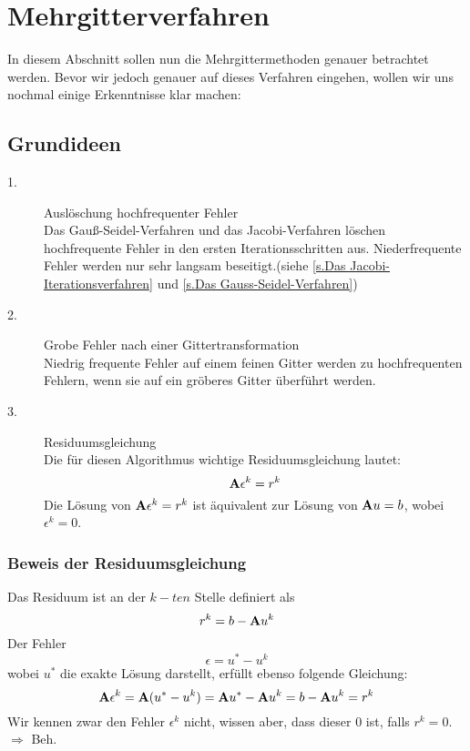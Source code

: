 \chapter{Mehrgitterverfahren}\label{c.Mehrgitterverfahren}

In diesem Abschnitt sollen nun die Mehrgittermethoden genauer betrachtet werden. Bevor wir jedoch genauer auf dieses Verfahren eingehen, wollen wir uns nochmal einige Erkenntnisse klar machen:

\section{Grundideen}

\begin{description}

\item[1.] Auslöschung hochfrequenter Fehler \\
Das Gauß-Seidel-Verfahren und das Jacobi-Verfahren löschen hochfrequente Fehler in den ersten Iterationsschritten aus. Niederfrequente Fehler werden nur sehr langsam beseitigt.(siehe \autoref{s.Das Jacobi-Iterationsverfahren} und \autoref{s.Das Gauss-Seidel-Verfahren})
\item[2.] Grobe Fehler nach einer Gittertransformation \\
Niedrig frequente Fehler auf einem feinen Gitter werden zu hochfrequenten Fehlern, wenn sie auf ein gröberes Gitter überführt werden.
\item[3.] Residuumsgleichung \\
Die für diesen Algorithmus wichtige Residuumsgleichung lautet:
\begin{equation}
{\textbf{A}} \epsilon^{k} = r^{k}\label{eq.Residuumsgleichung}
\end{equation}
Die Lösung von ${\textbf{A}} \epsilon^{k} = r^{k}$ ist äquivalent zur Lösung von ${\textbf{A}}u=b$, wobei $\epsilon^{k} = 0$.

\end{description}

\subsection{Beweis der Residuumsgleichung}

Das Residuum ist an der $k-ten$ Stelle definiert als 
\begin{equation}
r^{k} = b - {\textbf{A}}u^{k}
\end{equation}
Der Fehler
\begin{equation}
\epsilon = u^{*} - u^{k}\label{eq.Fehler}
\end{equation}
wobei $u^{*}$ die exakte Lösung darstellt, erfüllt ebenso folgende Gleichung:
\begin{equation}
{\textbf{A}}\epsilon^{k} = {\textbf{A}}(u^{*} - u^{k}) = {\textbf{A}} u^{*} - {\textbf{A}} u^{k} = b - {\textbf{A}} u^{k} = r^{k}
\end{equation}
Wir kennen zwar den Fehler $\epsilon^{k}$ nicht, wissen aber, dass dieser $0$ ist, falls $r^{k} = 0$.
$\Longrightarrow$ Beh.

